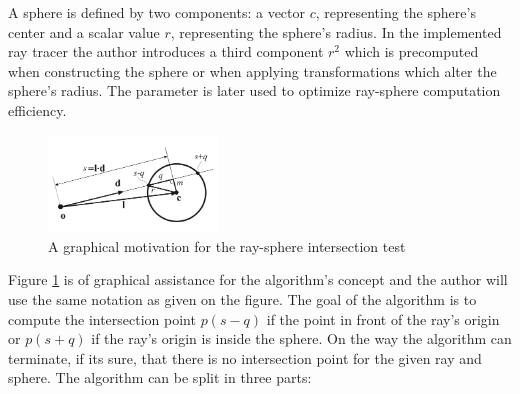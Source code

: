 \documentclass{article}
\begin{document}
A sphere is defined by two components: a vector $c$, representing the sphere's center and a scalar value $r$, representing the sphere's radius. In the implemented ray tracer the author introduces a third component $r^2$ which is precomputed when constructing the sphere or when applying transformations which alter the sphere's radius. The parameter is later used to optimize ray-sphere computation efficiency.

\begin{figure} 
    \centering
    \includegraphics[width=0.4\textwidth]{ray_sphere}
    \caption{A graphical motivation for the ray-sphere intersection test}
    \label{fig:raysphere}
\end{figure}

Figure \ref{fig:raysphere} is of graphical assistance for the algorithm's concept and the author will use the same notation as given on the figure. The goal of the algorithm is to compute the intersection point $p(s-q)$ if the point in front of the ray's origin or $p(s+q)$ if the ray's origin is inside the sphere. On the way the algorithm can terminate, if its sure, that there is no intersection point for the given ray and sphere. The algorithm can be split in three parts: \cite{realtime_ren}
\end{document}
